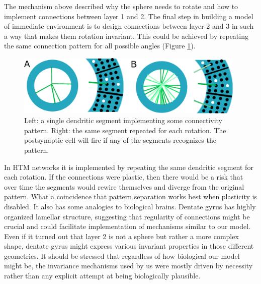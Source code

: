 \documentclass[12pt]{article}
\begin{document}
The mechanism above described why the sphere needs to rotate and how to implement connections between layer 1 and 2. The final step in building a model of immediate environment is to design connections between layer 2 and 3 in such a way that makes them rotation invariant. This could be achieved by repeating the same connection pattern for all possible angles (Figure \ref{fig:rotation_invariant_pattern}). 

\begin{figure}[!h]
	\centering
	\includegraphics[width=11cm]{rotation_invariant_pattern}
	\caption{Left: a single dendritic segment implementing some connectivity pattern. Right:
	 the same segment repeated for each rotation. The postsynaptic cell will fire if any of the
    segments recognizes the pattern.}
	\label{fig:rotation_invariant_pattern}
\end{figure}


In HTM networks it is implemented by repeating the same dendritic segment for each rotation. If the connections were plastic, then there would be a risk that over time the segments would rewire themselves and diverge from the original pattern. What a coincidence that pattern separation works best when plasticity is disabled. It also has some 
analogies to biological brains. Dentate gyrus has highly organized lamellar structure, suggesting that regularity of connections might be crucial and could facilitate implementation of mechanisms similar to our model. Even if it turned out that layer 2 is not a sphere but rather a more complex shape, dentate gyrus might express various invariant properties in those different geometries. It should be stressed that regardless of how biological our model might be, the invariance mechanisms used by us were mostly driven by necessity rather than any explicit attempt at being biologically plausible. 
\end{document}
